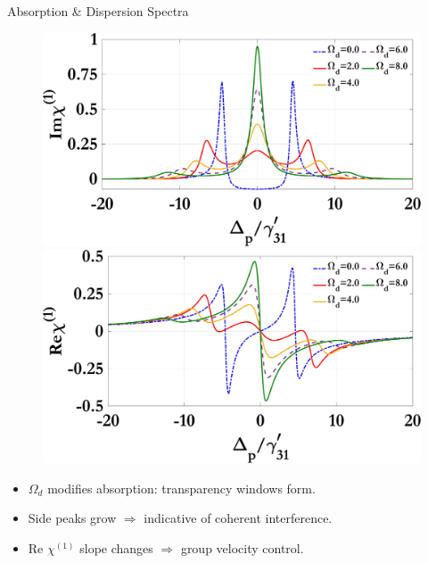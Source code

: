\documentclass[12pt,aspectratio=1610]{beamer}
\begin{document}
\begin{frame}{Absorption \& Dispersion Spectra}
  \vspace{-22pt}
  \begin{figure}[h]
    \centering
    \begin{minipage}{0.48\textwidth}
      \centering
      \includegraphics[width=\linewidth]{Assets/Img_chi1_Omega_d.jpeg}
      \subcaption{}
    \end{minipage}
    \hfill
    \begin{minipage}{0.48\textwidth}
      \centering
      \includegraphics[width=\linewidth]{Assets/Real_chi1_Omega_d.jpeg}
      \subcaption{}
    \end{minipage}\label{fig:chi1_d}
   \end{figure}
   \begin{itemize}
    \item $\Omega_d$ modifies absorption: transparency windows form.
    \item Side peaks grow $\Rightarrow$ indicative of coherent interference.
    \item Re $\chi^{(1)}$ slope changes $\Rightarrow$ group velocity control.
  \end{itemize}
\end{frame}
\end{document}
